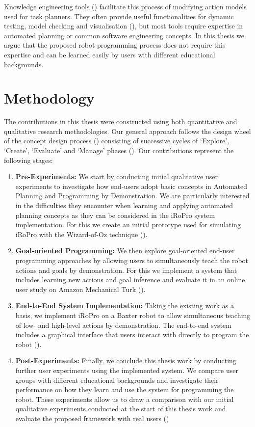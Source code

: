 Knowledge engineering tools () facilitate this process of modifying action models used for task planners.
They often provide useful functionalities for dynamic testing, model checking and visualisation (\cite{simpson2007planning}), but most tools require expertise in automated planning or common software engineering concepts.
In this thesis we argue that the proposed robot programming process does not require this expertise and can be learned easily by users with different educational backgrounds.


\section{Methodology}
The contributions in this thesis were constructed using both quantitative and qualitative research methodologies.
Our general approach follows the design wheel of the concept design process (\cite{designwheel}) consisting of successive cycles of `Explore', `Create', `Evaluate' and `Manage' phases ().
Our contributions represent the following stages:
\begin{enumerate}
	\item {\textbf{Pre-Experiments: }We start by conducting initial qualitative user experiments to investigate how end-users adopt basic concepts in Automated Planning and Programming by Demonstration.
	We are particularly interested in the difficulties they encounter when learning and applying automated planning concepts as they can be considered in the iRoPro system implementation.
	For this we create an initial prototype used for simulating iRoPro with the Wizard-of-Oz technique ().
	}
	\item {\textbf{Goal-oriented Programming: }We then explore goal-oriented end-user programming approaches by allowing users to simultaneously teach the robot actions and goals by demonstration.
	For this we implement a system that includes learning new actions and goal inference and evaluate it in an online user study on Amazon Mechanical Turk ().}
	\item {\textbf{End-to-End System Implementation:} Taking the existing work as a basis, we implement iRoPro on a Baxter robot to allow simultaneous teaching of low- and high-level actions by demonstration.
	The end-to-end system includes a graphical interface that users interact with directly to program the robot ().}
	\item {\textbf{Post-Experiments: }Finally, we conclude this thesis work by conducting further user experiments using the implemented system.
		We compare user groups with different educational backgrounds and investigate their performance on how they learn and use the system for programming the robot.
		These experiments allow us to draw a comparison with our initial qualitative experiments conducted at the start of this thesis work and evaluate the proposed framework with real users ()}
\end{enumerate}


